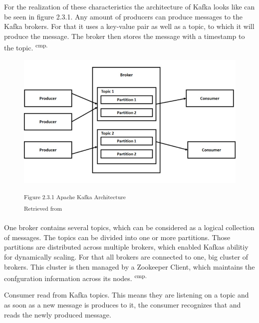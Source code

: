 For the realization of these characteristics the architecture of Kafka looks like can be seen in figure 2.3.1. Any amount of producers can produce messages to the Kafka brokers. For that it uses a key-value pair as well as a topic, to which it will produce the message. The broker then stores the message with a timestamp to the topic. \textsuperscript{cmp.\cite{26}}

\begin{figure}[h]
\centering
\includegraphics[width=\textwidth/5*4]{images/kafka_architecture.png}

\textsuperscript{Figure 2.3.1 Apache Kafka Architecture}\\
\textsuperscript{Retrieved from \cite{27}}
\end{figure}

One broker contains several topics, which can be considered as a logical collection of messages. The topics can be divided into one or more partitions. Those partitions are distributed across multiple brokers, which enabled Kafkas abilitiy for dynamically scaling. For that all brokers are connected to one, big cluster of brokers. This cluster is then managed by a Zookeeper Client, which maintains the confguration information across its nodes. \textsuperscript{cmp.\cite{27}}


Consumer read from Kafka topics. This means they are listening on a topic and as soon as a new message is produces to it, the consumer recognizes that and reads the newly produced message.

